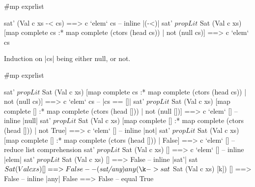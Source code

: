 
\h{#mp exprlist}\begin{code}
sat' (Val c xs -< cs) ==> c `elem` cs
    -- inline |(-<)|
sat' $ propLit $ Sat (Val c xs) [map complete cs :* map complete (ctors (head cs)) | not (null cs)] ==> c `elem` cs
\end{code}

Induction on |cs| being either null, or not.

\h{#mp exprlist}\begin{code}
sat' $ propLit $ Sat (Val c xs) [map complete cs :* map complete (ctors (head cs)) | not (null cs)] ==> c `elem` cs
    -- |cs == []|
sat' $ propLit $ Sat (Val c xs) [map complete [] :* map complete (ctors (head [])) | not (null [])] ==> c `elem` []
    -- inline |null|
sat' $ propLit $ Sat (Val c xs) [map complete [] :* map complete (ctors (head [])) | not True] ==> c `elem` []
    -- inline |not|
sat' $ propLit $ Sat (Val c xs) [map complete [] :* map complete (ctors (head [])) | False] ==> c `elem` []
    -- reduce list comprehension
sat' $ propLit $ Sat (Val c xs) [] ==> c `elem` []
    -- inline |elem|
sat' $ propLit $ Sat (Val c xs) [] ==> False
    -- inline |sat'|
sat $ Sat (Val c xs) [] ==> False
    -- \lemma{sat/any}
any (\k -> sat $ Sat (Val c xs) [k]) [] ==> False
    -- inline |any|
False ==> False
    -- equal
True
\end{code}

